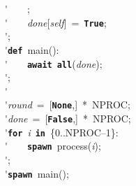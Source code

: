 \'\>~~~~;\\

\'\>~~~~\textit{done}[\textit{self}]~=~\texttt{\textbf{True}};\\

\'\>;\\

\'\>\texttt{\textbf{def}}~main():\\

\'\>~~~~\texttt{\textbf{await}}~\texttt{\textbf{all}}(\textit{done});\\

\'\>;\\

\'\>\\

\'\>\textit{round}~=~[\texttt{\textbf{None}},]~*~NPROC;\\

\'\>\textit{done}~=~[\texttt{\textbf{False}},]~*~NPROC;\\

\'\>\texttt{\textbf{for}}~\textit{i}~\texttt{\textbf{in}}~\{0..NPROC--1\}:\\

\'\>~~~~\texttt{\textbf{spawn}}~process(\textit{i});\\

\'\>;\\

\'\>\texttt{\textbf{spawn}}~main();